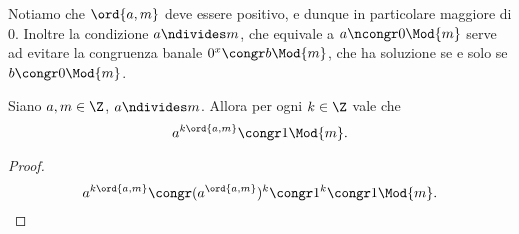 \begin{remark}
    Notiamo che $\ord{a, m}$ deve essere positivo, e dunque in particolare maggiore di $0$. Inoltre la condizione $a \ndivides m$, che equivale a $a \ncongr 0 \Mod{m}$ serve ad evitare la congruenza banale $0^x \congr b \Mod{m}$, che ha soluzione se e solo se $b \congr 0 \Mod{m}$.
\end{remark}

\begin{proposition}\label{multipli_ord_equiv_1}
    Siano $a, m \in \Z$, $a \ndivides m$. Allora per ogni $k \in \Z$ vale che \begin{equation}
        a^{k\ord{a, m}} \congr 1 \Mod{m}.
    \end{equation}
\end{proposition}
\begin{proof}
    \[
        a^{k\ord{a, m}} \congr (a^{\ord{a, m}})^k \congr 1^k \congr 1 \Mod{m}. \qedhere
    \]
\end{proof}

